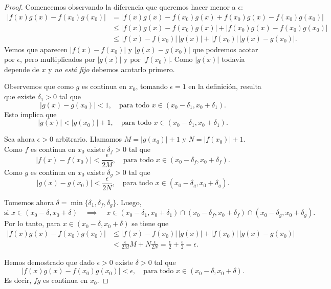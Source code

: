 \begin{proof}
    Comencemos observando la diferencia que queremos hacer menor a $\epsilon$:
\begin{align*}
\big|f(x) g(x)-f(x_0) g(x_0)\big|
&=
\big|f(x) g(x)-f(x_0) g(x)+f(x_0) g(x)-f(x_0) g(x_0)\big|
\\
&\le 
\big|f(x) g(x)-f(x_0) g(x)\big|+\big|f(x_0) g(x)-f(x_0) g(x_0)\big|
\\
&\le 
\big|f(x)-f(x_0)\big|\,\big|g(x)\big|+\big|f(x_0)\big| \, \big| g(x)- g(x_0)\big|.
\end{align*}
Vemos que aparecen $|f(x)-f(x_0)|$ y $|g(x)- g(x_0)|$ que podremos acotar por $\epsilon$, pero multiplicados por $|g(x)|$ y por $|f(x_0)|$.
Como $|g(x)|$ todavía depende de $x$ y \emph{no está fijo} debemos acotarlo primero.

Observemos que como $g$ es continua en $x_0$, tomando $\epsilon=1$ en la definición, resulta que existe $\delta_1>0$ tal que
\[
|g(x)-g(x_0)|<1, \quad\text{para todo $x\in(x_0-\delta_1,x_0+\delta_1)$}.
\]
Esto implica que 
\[
|g(x)| < |g(x_0)|+1,  \quad\text{para todo $x\in(x_0-\delta_1,x_0+\delta_1)$}.
\]

Sea ahora $\epsilon>0$ arbitrario.
Llamamos $M=|g(x_0)|+1$ y $N=|f(x_0)|+1$. 
Como $f$ es continua en $x_0$ existe $\delta_f>0$ tal que 
\[
|f(x)-f(x_0)|<\frac{\epsilon}{2M}, \quad\text{para todo $x\in(x_0-\delta_f,x_0+\delta_f)$}.
\]
Como $g$ es continua en $x_0$ existe $\delta_g>0$ tal que 
\[
|g(x)-g(x_0)|<\frac\epsilon{2N}, \quad\text{para todo $x\in(x_0-\delta_g,x_0+\delta_g)$}.
\]

Tomemos ahora $\delta=\min\{\delta_1,\delta_f,\delta_g\}$. Luego,
\[
\text{si $x\in (x_0-\delta,x_0+\delta)$}
\quad\implies\quad
x\in(x_0-\delta_1,x_0+\delta_1)\cap(x_0-\delta_f,x_0+\delta_f)\cap(x_0-\delta_g,x_0+\delta_g).
\]
Por lo tanto, para $x\in (x_0-\delta,x_0+\delta)$ se tiene que
\begin{align*}
\big|f(x) g(x)-f(x_0) g(x_0)\big|
&\le 
\big|f(x)-f(x_0)\big|\,\big|g(x)\big|+\big|f(x_0)\big| \, \big| g(x)- g(x_0)\big|
\\
&< \frac{\epsilon}{2M} M + N \frac\epsilon{2N} = \frac\epsilon2+\frac\epsilon2=\epsilon.
\end{align*}

Hemos demostrado que dado $\epsilon>0$ existe $\delta>0$ tal que
\[
\big|f(x) g(x)-f(x_0) g(x_0)\big|<\epsilon, \quad\text{para todo $x\in(x_0-\delta,x_0+\delta)$}.
\]
Es decir, $fg$ es continua en $x_0$.
\end{proof}

